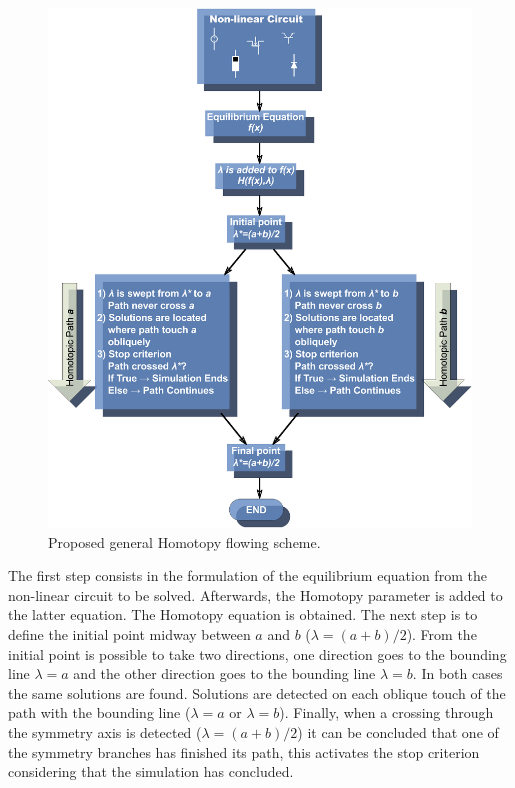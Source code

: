 \documentclass[conference,letterpaper,onecolumn]{IEEEtran}
\begin{document}
\begin{figure}[tbp]
{\tiny
\centerline{
\centering
\includegraphics[scale=0.5]{figs/esquema_general_propuesto.eps}}
\caption{Proposed general Homotopy flowing scheme.}
\label{esquemag}}
\end{figure}

The first step consists in the formulation of the equilibrium equation from the non-linear circuit to be solved. Afterwards, the Homotopy parameter is added to the latter equation. The Homotopy equation is obtained. The next step is to define the initial point midway between  $a$ and $b$ ($\lambda=(a+b)/2$). From the initial point is possible to take two directions, one direction goes to the bounding line $\lambda=a$ and the other direction goes to the bounding line $\lambda=b$. In both cases the same solutions are found. Solutions are detected on each oblique touch of the path with the bounding line ($\lambda=a$ or $\lambda=b$). Finally, when a crossing through the symmetry axis is detected ($\lambda=(a+b)/2$) it can be concluded that one of the symmetry branches has finished its path, this activates the stop criterion considering that the simulation has concluded.
\end{document}
